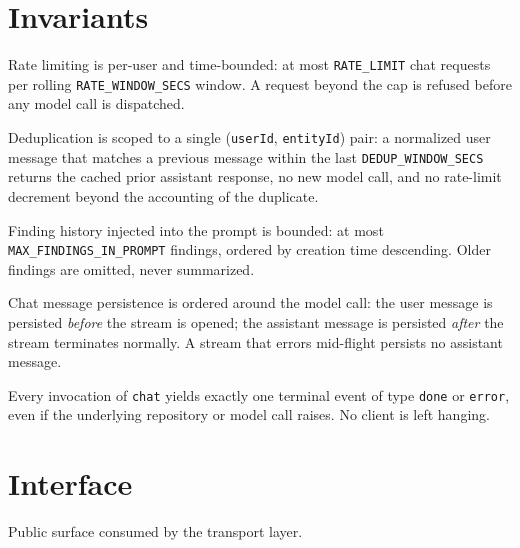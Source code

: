 \section{Invariants}
\begin{invariant}
Rate limiting is per-user and time-bounded: at most \texttt{RATE\_LIMIT} chat requests per rolling
\texttt{RATE\_WINDOW\_SECS} window. A request beyond the cap is refused before any model call is dispatched.
\end{invariant}

\begin{invariant}
Deduplication is scoped to a single (\texttt{userId}, \texttt{entityId}) pair: a normalized user
message that matches a previous message within the last \texttt{DEDUP\_WINDOW\_SECS} returns the
cached prior assistant response, no new model call, and no rate-limit decrement beyond the
accounting of the duplicate.
\end{invariant}

\begin{invariant}
Finding history injected into the prompt is bounded: at most \texttt{MAX\_FINDINGS\_IN\_PROMPT}
findings, ordered by creation time descending. Older findings are omitted, never summarized.
\end{invariant}

\begin{invariant}
Chat message persistence is ordered around the model call: the user message is persisted
\emph{before} the stream is opened; the assistant message is persisted \emph{after} the stream
terminates normally. A stream that errors mid-flight persists no assistant message.
\end{invariant}

\begin{invariant}
Every invocation of \texttt{chat} yields exactly one terminal event of type \texttt{done} or
\texttt{error}, even if the underlying repository or model call raises. No client is left hanging.
\end{invariant}

\section{Interface}
Public surface consumed by the transport layer.

